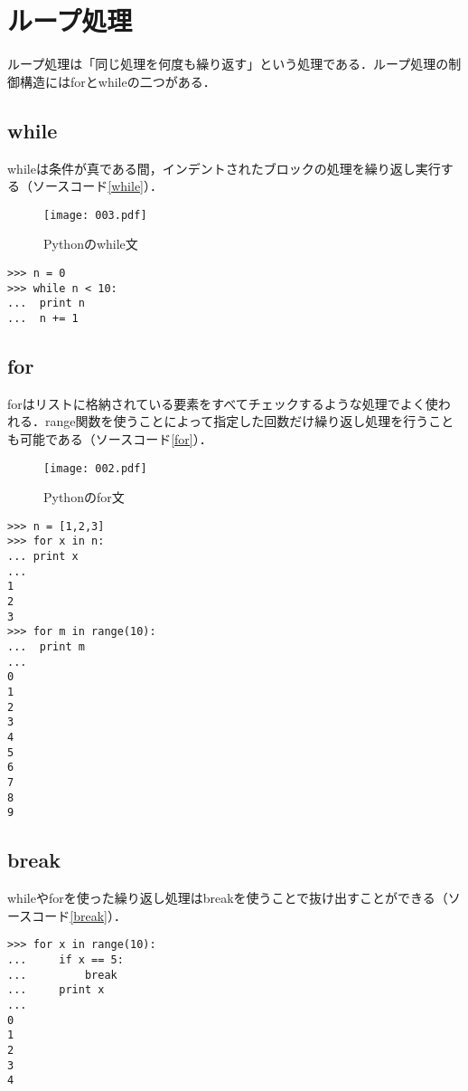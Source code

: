 \section{ループ処理}
ループ処理は「同じ処理を何度も繰り返す」という処理である．ループ処理の制御構造にはforとwhileの二つがある．
\subsection{while}
whileは条件が真である間，インデントされたブロックの処理を繰り返し実行する（ソースコード\ref{while}）．
\begin{figure}[htbp]
 \centering
  \texttt{[image: 003.pdf]}
  \caption{Pythonのwhile文}
  \label{scale}
\end{figure}

\begin{lstlisting}[caption=whileの使い方, label=while]
>>> n = 0
>>> while n < 10:
...	 print n
...	 n += 1
\end{lstlisting}

\subsection{for}
forはリストに格納されている要素をすべてチェックするような処理でよく使われる．range関数を使うことによって指定した回数だけ繰り返し処理を行うことも可能である（ソースコード\ref{for}）．
\begin{figure}[h]
 \centering
  \texttt{[image: 002.pdf]}
  \caption{Pythonのfor文}
\end{figure}

\begin{lstlisting}[caption=forの使い方, label=for]
>>> n = [1,2,3]
>>> for x in n:
...	print x 	
...
1
2
3
>>> for m in range(10):
...	 print m
...
0
1
2
3
4
5
6
7
8
9
\end{lstlisting}


\subsection{break}
whileやforを使った繰り返し処理はbreakを使うことで抜け出すことができる（ソースコード\ref{break}）．
\begin{lstlisting}[caption=break, label=break]
>>> for x in range(10):
... 	if x == 5:
... 		break
... 	print x
...
0
1
2
3
4
\end{lstlisting}


